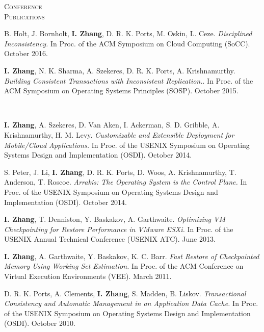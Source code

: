 \documentclass[10pt,times]{report}
\newlength{\sectiongap}
\newlength{\sectioncolwidth}
\newlength{\colgap}
\newlength{\stuffwidth}
\newenvironment{rtable}{
  \begin{minipage}{\textwidth}
  }{
  \end{minipage}
}
\newenvironment{rsection}[1]{
  \begin{minipage}[t]{\sectioncolwidth}
    \textsc{#1}
  \end{minipage}
  \hspace{\colgap}
  \begin{minipage}[t]{\stuffwidth}
  }{
    \removelastskip
  \end{minipage}
  \\[\sectiongap]
}
\begin{document}
\begin{rtable}
\begin{rsection}{Conference\\Publications}
    B. Holt, J. Bornholt, \textbf{I. Zhang}, D. R. K. Ports, M.
    Oskin, L. Ceze. \textit{Disciplined Inconsistency.}  In
    Proc. of the ACM Symposium on Cloud Computing (SoCC).
    October 2016.\\\vspace{-0.5em}

        \textbf{I. Zhang}, N. K. Sharma, A. Szekeres, D. R. K. Ports,
    A. Krishnamurthy. \textit{Building Consistent Transactions with
      Inconsistent Replication.}.  In Proc. of the ACM Symposium
    on Operating Systems Principles (SOSP).  October
    2015.

    \end{rsection}  
\end{rtable}

\begin{rtable}
  \begin{rsection} {}
\textbf{I. Zhang}, A. Szekeres, D. Van Aken, I. Ackerman,
    S. D. Gribble, A. Krishnamurthy, H. M. Levy. \textit{Customizable
      and Extensible Deployment for Mobile/Cloud Applications.}  In
    Proc. of the USENIX Symposium on Operating Systems Design
    and
    Implementation (OSDI).  October 2014. \\\vspace{-0.5em}
  
     S. Peter, J. Li, \textbf{I. Zhang}, D. R. K. Ports, D.  Woos,
    A. Krishnamurthy, T. Anderson, T. Roscoe.  \textit{Arrakis: The
      Operating System is the Control Plane.}  In Proc. of the USENIX
    Symposium on Operating Systems Design and Implementation (OSDI).
    October 2014.  \\\vspace{-0.5em}

    \textbf{I. Zhang}, T. Denniston, Y. Baskakov, A. Garthwaite.
    \textit{Optimizing VM Checkpointing for Restore Performance in
      VMware ESXi.}  In Proc. of the USENIX Annual Technical
    Conference (USENIX ATC).  June 2013. \\\vspace{-0.5em}

    \textbf{I. Zhang}, A. Garthwaite, Y. Baskakov,
    K. C. Barr. \textit{Fast Restore of Checkpointed Memory Using
      Working Set Estimation.}  In Proc. of the ACM Conference
    on Virtual Execution Environments (VEE).  March
    2011.\\\vspace{-0.5em}

    D. R. K. Ports, A. Clements, \textbf{I. Zhang}, S. Madden,
    B. Liskov. \textit{Transactional Consistency and Automatic
      Management in an Application Data Cache.}  In Proc. of the
    USENIX Symposium on Operating Systems Design and Implementation
    (OSDI). October 2010.\\\vspace{-0.5em}


\end{rsection}
\end{rtable}
\end{document}
